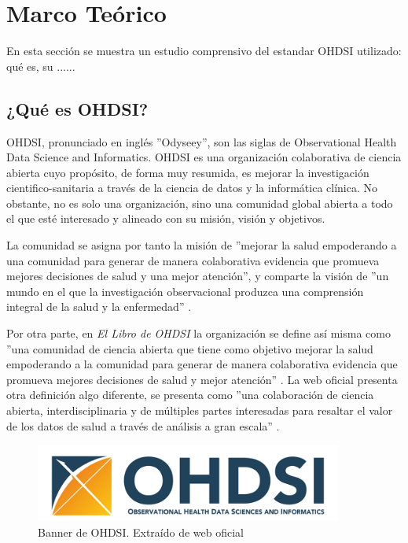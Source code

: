 \chapter{Marco Teórico}\label{cap:05EstudioPrevio}

En esta sección se muestra un estudio comprensivo del estandar OHDSI utilizado: qué es, su ......


\section{¿Qué es OHDSI?} \label{sec:05OHDSI}

OHDSI, pronunciado en inglés ''Odyseey'', son las siglas de Observational Health Data Science and Informatics. OHDSI es una organización colaborativa de ciencia abierta cuyo propósito, de forma muy resumida, es mejorar la investigación cientifico-sanitaria a través de la ciencia de datos y la informática clínica. No obstante, no es solo una organización, sino una comunidad global abierta a todo el que esté interesado y alineado con su misión, visión y objetivos. 

La comunidad se asigna por tanto la misión de ''mejorar la salud empoderando a una comunidad para generar de manera colaborativa evidencia que promueva mejores decisiones de salud y una mejor atención'', y comparte la visión de ''un mundo en el que la investigación observacional produzca una comprensión integral de la salud y la enfermedad'' \cite{OHDSIwebsite}\cite{OHDSIbook}. 

Por otra parte, en \textit{El Libro de OHDSI} la organización se define así misma como ''una comunidad de ciencia abierta que tiene como objetivo mejorar la salud empoderando a la comunidad para generar de manera colaborativa evidencia que promueva mejores decisiones de salud y mejor atención'' \cite{OHDSIbook}. La web oficial presenta otra definición algo diferente, se presenta como ''una colaboración de ciencia abierta, interdisciplinaria y de múltiples partes interesadas para resaltar el valor de los datos de salud a través de análisis a gran escala'' \cite{OHDSIwebsite}.

\begin{figure}[H]
    \centering
    \includegraphics[width=0.90\textwidth]{figures/OHDSIbanner.png}
    \caption{Banner de OHDSI. Extraído de web oficial \cite{OHDSIwebsite}}
    \label{fig:OHDSIbanner}
\end{figure}

